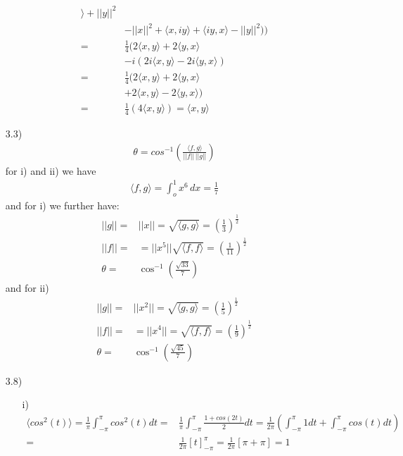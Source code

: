 \documentclass[letterpaper,12pt]{article}
\theoremstyle{definition}
\begin{document}
\begin{enumerate}
\begin{align*}
\rangle +||y||^2 \\ 
\quad & - ||x||^2 +\langle x, iy \rangle +\langle  iy ,x\rangle -||y||^2 ))
\\
=& \frac{1}{4}( 2 \langle x, y \rangle + 2\langle y, x \rangle \\
\quad &-i(2i\langle x, y \rangle  - 2i\langle y,x \rangle ) \\
=& \frac{1}{4}(2 \langle x, y \rangle + 2\langle y, x \rangle \\
\quad & + 2\langle x, y \rangle  - 2\langle y,x \rangle) \\
=& \frac{1}{4}(4\langle x, y \rangle) = \langle x, y \rangle
\end{align*}
\item[3.3)] \begin{eqnarray*}\theta = cos^{-1} \left( \frac{\langle f, g \rangle}{||f|| \, ||g||} \right) \end{eqnarray*}
for i) and ii) we have \begin{eqnarray*}
\langle f, g \rangle = \int_o^1 x^6 \, dx = \frac{1}{7}\end{eqnarray*}
and for i) we further have:
\begin{align*}
||g|| =&  ||x||= \sqrt{\langle g, g \rangle} = \left( \frac{1}{3} \right)^\frac{1}{2}\\
||f|| =&= ||x^5||  \sqrt{\langle f, f \rangle} =\left( \frac{1}{11} \right)^\frac{1}{2}\\
\theta =& \cos^{-1}\left( \frac{\sqrt{33}}{7} \right)
\end{align*}
and for ii)
\begin{align*}
||g|| =&  ||x^2||= \sqrt{\langle g, g \rangle} = \left( \frac{1}{5} \right)^\frac{1}{2}\\
||f|| =& =||x^4||= \sqrt{\langle f, f \rangle} =\left( \frac{1}{9} \right)^\frac{1}{2}\\
\theta =& \cos^{-1}\left( \frac{\sqrt{45}}{7} \right)
\end{align*}
\item[3.8)]
\begin{itemize}
\item[i)]\begin{align*}
\langle cos^2(t) \rangle = \frac{1}{\pi} \int_{-\pi}^{\pi} cos^2(t)dt =& \frac{1}{\pi} \int_{-\pi}^{\pi} \frac{1+cos(2t)}{2} dt = \frac{1}{2\pi} \left( \int_{-\pi}^{\pi}1dt + \int_{-\pi}^{\pi} cos(t)dt \right)\\
=& \frac{1}{2\pi} \left[ t \right]_{-\pi}^{\pi} = \frac{1}{2\pi} [\pi + \pi] = 1 \\

\end{align*}
\end{itemize}
\end{enumerate}
\end{document}
